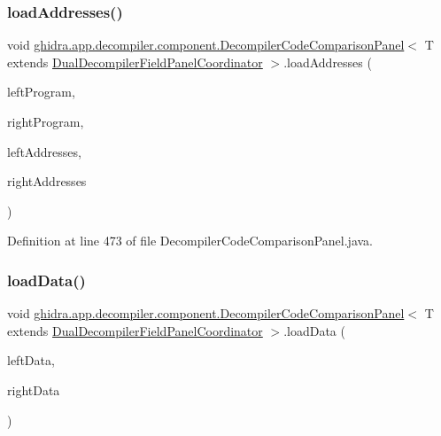 \subsubsection{\texorpdfstring{loadAddresses()}{loadAddresses()}}
{\footnotesize\ttfamily void \mbox{\hyperlink{classghidra_1_1app_1_1decompiler_1_1component_1_1_decompiler_code_comparison_panel}{ghidra.\+app.\+decompiler.\+component.\+Decompiler\+Code\+Comparison\+Panel}}$<$ T extends \mbox{\hyperlink{classghidra_1_1app_1_1decompiler_1_1component_1_1_dual_decompiler_field_panel_coordinator}{Dual\+Decompiler\+Field\+Panel\+Coordinator}} $>$.load\+Addresses (\begin{DoxyParamCaption}\item[{Program}]{left\+Program,  }\item[{Program}]{right\+Program,  }\item[{Address\+Set\+View}]{left\+Addresses,  }\item[{Address\+Set\+View}]{right\+Addresses }\end{DoxyParamCaption})\hspace{0.3cm}{\ttfamily [inline]}}



Definition at line 473 of file Decompiler\+Code\+Comparison\+Panel.\+java.

\mbox{\label{classghidra_1_1app_1_1decompiler_1_1component_1_1_decompiler_code_comparison_panel_adb4f6d5976701b2eff6361e137ecb1b0}} 
\subsubsection{\texorpdfstring{loadData()}{loadData()}}
{\footnotesize\ttfamily void \mbox{\hyperlink{classghidra_1_1app_1_1decompiler_1_1component_1_1_decompiler_code_comparison_panel}{ghidra.\+app.\+decompiler.\+component.\+Decompiler\+Code\+Comparison\+Panel}}$<$ T extends \mbox{\hyperlink{classghidra_1_1app_1_1decompiler_1_1component_1_1_dual_decompiler_field_panel_coordinator}{Dual\+Decompiler\+Field\+Panel\+Coordinator}} $>$.load\+Data (\begin{DoxyParamCaption}\item[{Data}]{left\+Data,  }\item[{Data}]{right\+Data }\end{DoxyParamCaption})\hspace{0.3cm}{\ttfamily [inline]}}



